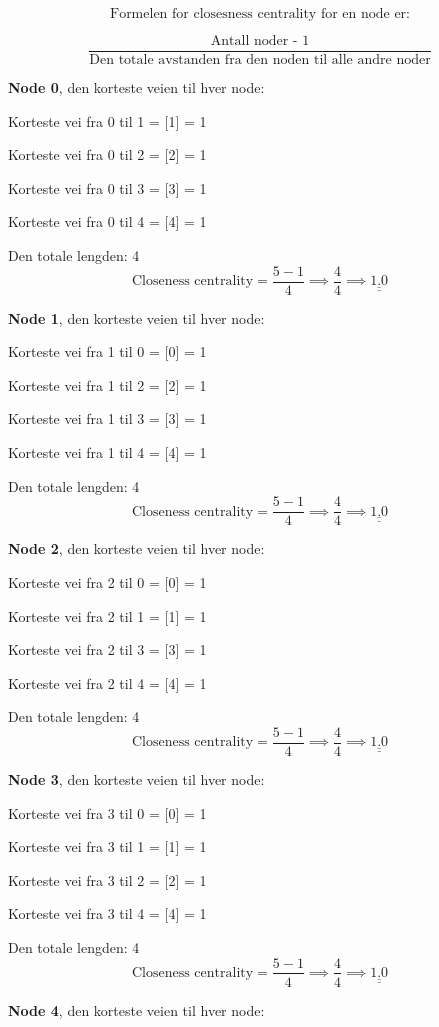 \documentclass[11pt]{article}
\begin{document}
\[\text{Formelen for closesness centrality for en node er:}\]

\[\frac{\text{Antall noder - 1}}{\text{Den totale avstanden fra den noden til alle andre noder}}\]

\textbf{Node 0}, den korteste veien til hver node:

Korteste vei fra 0 til 1 = {[}1{]} = 1

Korteste vei fra 0 til 2 = {[}2{]} = 1

Korteste vei fra 0 til 3 = {[}3{]} = 1

Korteste vei fra 0 til 4 = {[}4{]} = 1

Den totale lengden: 4
\[\text{Closeness centrality} = \frac{5 - 1}{4} \implies \frac{4}{4} \implies\underline{\underline{ 1.0 }}\]

\textbf{Node 1}, den korteste veien til hver node:

Korteste vei fra 1 til 0 = {[}0{]} = 1

Korteste vei fra 1 til 2 = {[}2{]} = 1

Korteste vei fra 1 til 3 = {[}3{]} = 1

Korteste vei fra 1 til 4 = {[}4{]} = 1

Den totale lengden: 4
\[\text{Closeness centrality} = \frac{5 - 1}{4} \implies \frac{4}{4} \implies\underline{\underline{ 1.0 }}\]

\textbf{Node 2}, den korteste veien til hver node:

Korteste vei fra 2 til 0 = {[}0{]} = 1

Korteste vei fra 2 til 1 = {[}1{]} = 1

Korteste vei fra 2 til 3 = {[}3{]} = 1

Korteste vei fra 2 til 4 = {[}4{]} = 1

Den totale lengden: 4
\[\text{Closeness centrality} = \frac{5 - 1}{4} \implies \frac{4}{4} \implies\underline{\underline{ 1.0 }}\]

\textbf{Node 3}, den korteste veien til hver node:

Korteste vei fra 3 til 0 = {[}0{]} = 1

Korteste vei fra 3 til 1 = {[}1{]} = 1

Korteste vei fra 3 til 2 = {[}2{]} = 1

Korteste vei fra 3 til 4 = {[}4{]} = 1

Den totale lengden: 4
\[\text{Closeness centrality} = \frac{5 - 1}{4} \implies \frac{4}{4} \implies\underline{\underline{ 1.0 }}\]

\textbf{Node 4}, den korteste veien til hver node:
\end{document}
